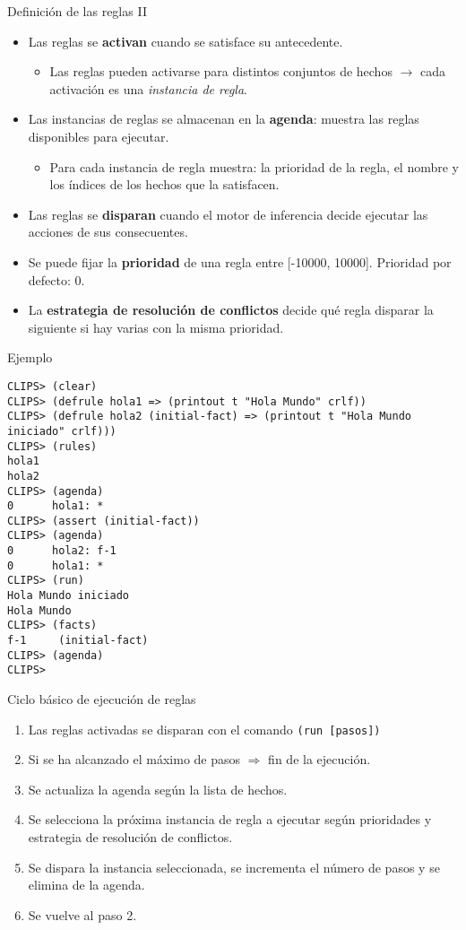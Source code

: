 \documentclass[usenames,dvipsnames,aspectratio=169]{beamer}
\begin{document}
\begin{frame}{Definición de las reglas II}
	\begin{itemize}
		\item Las reglas se \textbf{activan} cuando se satisface su antecedente.
		\begin{itemize}
			\item Las reglas pueden activarse para distintos conjuntos de hechos $\rightarrow$ cada activación es una \textit{instancia de regla}.
		\end{itemize}
		\item Las instancias de reglas se almacenan en la \textbf{agenda}: muestra las reglas disponibles para ejecutar.
		\begin{itemize}
			\item Para cada instancia de regla muestra: la prioridad de la regla, el nombre y los índices de los hechos que la satisfacen.
		\end{itemize}
		\item Las reglas se \textbf{disparan} cuando el motor de inferencia decide ejecutar las acciones de sus consecuentes.
		\item Se puede fijar la \textbf{prioridad} de una regla entre [-10000, 10000]. Prioridad por defecto: 0.
		\item La \textbf{estrategia de resolución de conflictos} decide qué regla disparar la siguiente si hay varias con la misma prioridad. 
	\end{itemize}
\end{frame}

\begin{frame}[fragile]{Ejemplo}
	\scriptsize
		\begin{verbatim}
CLIPS> (clear)
CLIPS> (defrule hola1 => (printout t "Hola Mundo" crlf))
CLIPS> (defrule hola2 (initial-fact) => (printout t "Hola Mundo iniciado" crlf)))
CLIPS> (rules)
hola1
hola2
CLIPS> (agenda)
0      hola1: *
CLIPS> (assert (initial-fact))
CLIPS> (agenda)
0      hola2: f-1
0      hola1: *
CLIPS> (run)
Hola Mundo iniciado
Hola Mundo
CLIPS> (facts)
f-1     (initial-fact)
CLIPS> (agenda)
CLIPS>
		\end{verbatim}
\end{frame}

\begin{frame}{Ciclo básico de ejecución de reglas}
	\begin{enumerate}
		\item Las reglas activadas se disparan con el comando \texttt{(run [pasos])}
		\item Si se ha alcanzado el máximo de pasos $\Rightarrow$ fin de la ejecución.
		\item Se actualiza la agenda según la lista de hechos.
		\item Se selecciona la próxima instancia de regla a ejecutar según prioridades y estrategia de resolución de conflictos.
		\item Se dispara la instancia seleccionada, se incrementa el número de pasos y se elimina de la agenda.
		\item Se vuelve al paso 2.
	\end{enumerate}
\end{frame}
\end{document}

